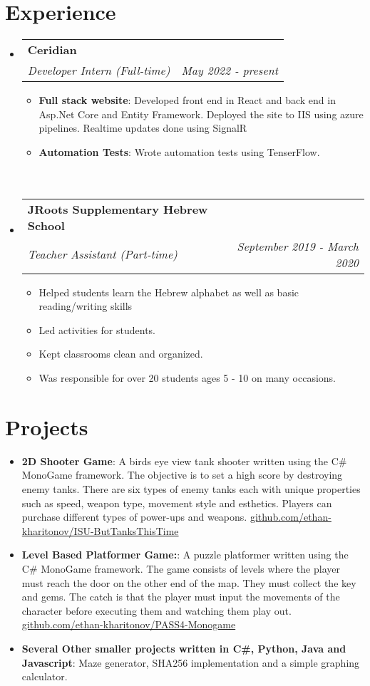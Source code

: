 \documentclass[a4paper,20pt]{article}
\makeatletter
\newcommand{\resumeItem}[2]{
	\item\small{
		\textbf{#1}{: #2 \vspace{-2pt}}
	}
}
\newcommand{\resumeSubheading}[4]{
	\vspace{-1pt}\item
	\begin{tabular*}{0.97\textwidth}{l@{\extracolsep{\fill}}r}
		\textbf{#1} & #2 \\
		\textit{#3} & \textit{#4} \\
	\end{tabular*}\vspace{-5pt}
}
\newcommand{\resumeSubItem}[2]{\resumeItem{#1}{#2}\vspace{-3pt}}
\newcommand{\resumeSubHeadingListStart}{\begin{itemize}[leftmargin=*]}
\newcommand{\resumeSubHeadingListEnd}{\end{itemize}}
\newcommand{\resumeItemListStart}{\begin{itemize}}
\newcommand{\resumeItemListEnd}{\end{itemize}\vspace{-5pt}}
\makeatother
\begin{document}
	\section{Experience}
	\resumeSubHeadingListStart
	\resumeSubheading{Ceridian}{}
	{Developer Intern (Full-time)}{May 2022 - present}
	\resumeItemListStart
	\resumeItem{Full stack website}
	{Developed front end in React and back end in Asp.Net Core and Entity Framework. Deployed the site to IIS using azure pipelines. Realtime updates done using SignalR}
	\resumeItem{Automation Tests}
	{Wrote automation tests using TenserFlow. ~~~~~~~~~~~~~~~~~~~~~~~~~~~~~~~~~~~~~~~~~~~~~~~~~~~~~~~~~~~~~~~~~~~~~~~~~~~~~~~~~~~~~~~~~~~~~~~~~~~~~~~~~~~~~~~~~~}
	\resumeItemListEnd
	\vspace{-5pt}
	\resumeSubheading
	{JRoots Supplementary Hebrew School}{}
	{Teacher Assistant (Part-time)}{September 2019 -  March 2020}
	\resumeItemListStart
	\item\small{
		{Helped students learn the Hebrew alphabet as well as basic reading/writing skills}
	}
	\item\small{
		{Led activities for students.}
	}
	\item\small{
		{Kept classrooms clean and organized.}
	}
	\item\small{
		{Was responsible for over 20 students ages 5 - 10 on many occasions. }
	}
	\resumeItemListEnd
	
	\resumeSubHeadingListEnd
	
	\vspace{-5pt}
	\section{Projects}
	\resumeSubHeadingListStart
	\resumeSubItem{2D Shooter Game}{A birds eye view tank shooter written using the C\# MonoGame framework. The objective is to set a high score by destroying enemy tanks. There are six types of enemy tanks each with unique properties such as speed, weapon type, movement style and esthetics. Players can purchase different types of power-ups and weapons. \href{https://github.com/ethan-kharitonov/ISU-ButTanksThisTime}{github.com/ethan-kharitonov/ISU-ButTanksThisTime}}
	\vspace{2pt}
	\resumeSubItem{Level Based Platformer Game:}{A puzzle platformer written using the C\# MonoGame framework. The game consists of levels where the player must reach the door on the other end of the map. They must collect the key and gems. The catch is that the player must input the movements of the character before executing them and watching them play out. \href{https://github.com/ethan-kharitonov/PASS4-Monogame}{github.com/ethan-kharitonov/PASS4-Monogame}}
	\vspace{2pt}
	\resumeSubItem{Several Other smaller projects written in C\#, Python, Java and Javascript}{Maze generator, SHA256 implementation and a simple graphing calculator.}
	\vspace{2pt}
	\resumeSubHeadingListEnd
	\vspace{-5pt}
\end{document}
